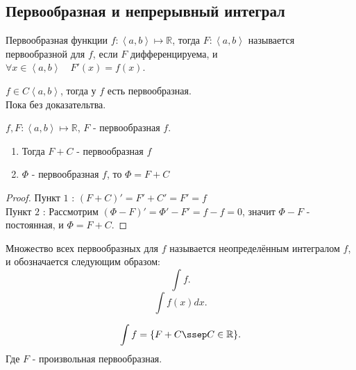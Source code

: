 \documentclass[11pt, oneside]{article}   	%
\begin{document}
    \subsection{Первообразная и непрерывный интеграл}
         \begin{definition}
             Первообразная функции $f : \left<a, b\right> \mapsto \mathbb{R}$, тогда $F : \left<a, b\right> $ называется первообразной для $f$, если $F$ дифференцируема, и $\forall{x\in \left<a, b\right>}\quad F'(x) = f(x)$.
         \end{definition}
         \begin{theorem}
             $f\in C\left<a, b\right>$, тогда у $f$ есть первообразная.\\
             Пока без доказательтва.
         \end{theorem}
         \begin{theorem}
             $f,F: \left<a, b\right> \mapsto \mathbb{R}$, $F$ -  первообразная $f$.\\
             \begin{enumerate}
                 \item Тогда $F+C$ - первообразная $f$ 
                 \item $\Phi$ -  первообразная $f$, то $\Phi = F + C$
             \end{enumerate}
             \begin{proof}
                 Пункт $1$ : $(F+C)' = F'+C' = F' = f$ \\
                 Пункт $2$ : Рассмотрим $(\Phi - F)' = \Phi' - F' = f - f =0$, значит $\Phi - F$ - постоянная, и $\Phi = F + C$.
             \end{proof}
         \end{theorem}
         \begin{definition}
             Множество всех первообразных для $f$ называется неопределённым интегралом $f$, и обозначается следующим образом:
             \[ \int f .\]
             \[ \int f(x)dx.\] 
         \end{definition}
         \begin{dlemma}
             \[ \int f = \{F+C \ssep C\in \mathbb{R}\}  .\]
             Где $F$ - произвольная первообразная.
         \end{dlemma}
\end{document}
